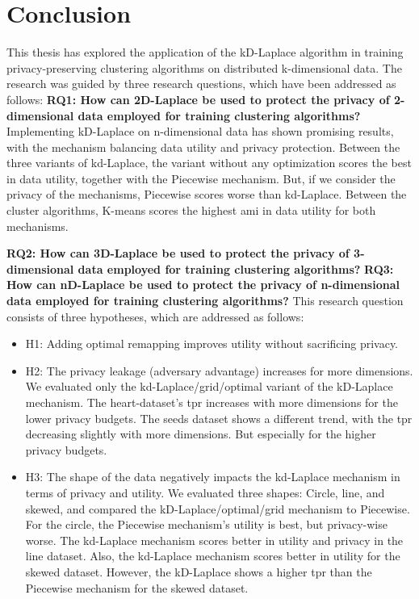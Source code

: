 \chapter{Conclusion}
This thesis has explored the application of the kD-Laplace algorithm in training privacy-preserving clustering algorithms on distributed k-dimensional data.
The research was guided by three research questions, which have been addressed as follows: \newline
\textbf{RQ1: How can 2D-Laplace be used to protect the privacy of 2-dimensional data employed for training clustering algorithms?} \newline
Implementing kD-Laplace on n-dimensional data has shown promising results, with the mechanism balancing data utility and privacy protection.
Between the three variants of kd-Laplace, the variant without any optimization scores the best in data utility, together with the Piecewise mechanism.
But, if we consider the privacy of the mechanisms, Piecewise scores worse than kd-Laplace.
Between the cluster algorithms, K-means scores the highest \gls{ami} in data utility for both mechanisms.

\textbf{RQ2: How can 3D-Laplace be used to protect the privacy of 3-dimensional data employed for training clustering algorithms?} \newline
{}
\textbf{RQ3: How can nD-Laplace be used to protect the privacy of n-dimensional data employed for training clustering algorithms?} \newline
This research question consists of three hypotheses, which are addressed as follows: \newline
\begin{itemize}
    \item H1: Adding optimal remapping improves utility without sacrificing privacy.

    \item H2: The privacy leakage (adversary advantage) increases for more dimensions.
          We evaluated only the kd-Laplace/grid/optimal variant of the kD-Laplace mechanism.
          The heart-dataset's \gls{tpr} increases with more dimensions for the lower privacy budgets.
          The seeds dataset shows a different trend, with the \gls{tpr} decreasing slightly with more dimensions.
          But especially for the higher privacy budgets.
    \item H3: The shape of the data negatively impacts the kd-Laplace mechanism in terms of privacy and utility.
          We evaluated three shapes: Circle, line, and skewed, and compared the kD-Laplace/optimal/grid mechanism to Piecewise.
          For the circle, the Piecewise mechanism's utility is best, but privacy-wise worse.
          The kd-Laplace mechanism scores better in utility and privacy in the line dataset.
          Also, the kd-Laplace mechanism scores better in utility for the skewed dataset.
          However, the kD-Laplace shows a higher \gls{tpr} than the Piecewise mechanism for the skewed dataset.
\end{itemize}


